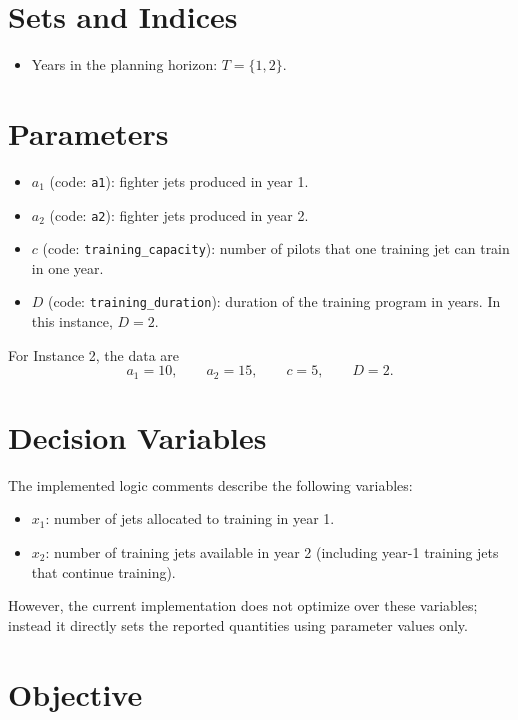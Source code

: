 \section*{Sets and Indices}

\begin{itemize}
    \item Years in the planning horizon: $T = \{1,2\}$.
\end{itemize}

\section*{Parameters}

\begin{itemize}
    \item $a_1$ (code: \texttt{a1}): fighter jets produced in year 1.
    \item $a_2$ (code: \texttt{a2}): fighter jets produced in year 2.
    \item $c$ (code: \texttt{training\_capacity}): number of pilots that one training jet can train in one year.
    \item $D$ (code: \texttt{training\_duration}): duration of the training program in years. In this instance, $D=2$.
\end{itemize}

For Instance 2, the data are
\[
a_1=10,\qquad a_2=15,\qquad c=5,\qquad D=2.
\]

\section*{Decision Variables}

The implemented logic comments describe the following variables:

\begin{itemize}
    \item $x_1$: number of jets allocated to training in year 1.
    \item $x_2$: number of training jets available in year 2 (including year-1 training jets that continue training).
\end{itemize}

However, the current implementation does not optimize over these variables; instead it directly sets the reported quantities using parameter values only.

\section*{Objective}

